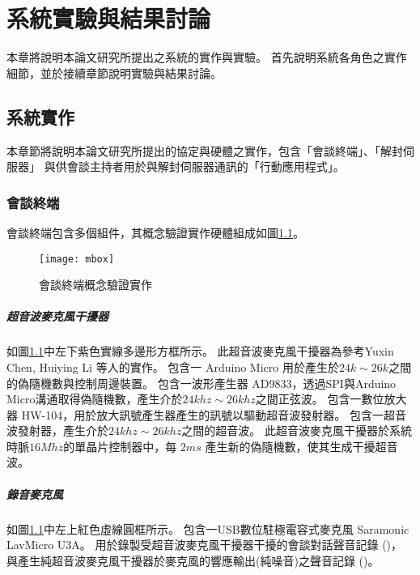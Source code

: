 \chapter{系統實驗與結果討論}

    本章將說明本論文研究所提出之系統的實作與實驗。
首先說明系統各角色之實作細節，並於接續章節說明實驗與結果討論。

\section{系統實作}

    本章節將說明本論文研究所提出的協定與硬體之實作，包含「會談終端」、「解封伺服器」
與供會談主持者用於與解封伺服器通訊的「行動應用程式」。

\subsection{會談終端}

    會談終端包含多個組件，其概念驗證實作硬體組成如圖\ref{fig:mbox}。

\begin{figure}[H]
    \centering
    \texttt{[image: mbox]}
    \caption{會談終端概念驗證實作}\label{fig:mbox}
\end{figure}


\paragraph{超音波麥克風干擾器}

    如圖\ref{fig:mbox}中左下紫色實線多邊形方框所示。
此超音波麥克風干擾器為參考Yuxin Chen,  Huiying Li 等人的實作\cite{chen2020wearable}。
包含一 Arduino Micro 用於產生於$24k\sim26k$之間的偽隨機數與控制周邊裝置。
包含一波形產生器 AD9833，透過SPI與Arduino Micro溝通取得偽隨機數，產生介於$24khz\sim26khz$之間正弦波。
包含一數位放大器 HW-104，用於放大訊號產生器產生的訊號以驅動超音波發射器。
包含一超音波發射器，產生介於$24khz\sim26khz$之間的超音波。
此超音波麥克風干擾器於系統時脈$16Mhz$的單晶片控制器中，每 $2ms$ 產生新的偽隨機數，使其生成干擾超音波。

\paragraph{錄音麥克風}

    如圖\ref{fig:mbox}中左上紅色虛線圓框所示。
包含一USB數位駐極電容式麥克風 Saramonic LavMicro U3A。
用於錄製受超音波麥克風干擾器干擾的會談對話聲音記錄 (\DEFrecJ)，
與產生純超音波麥克風干擾器於麥克風的響應輸出(純噪音)之聲音記錄 (\DEFrecN)。

